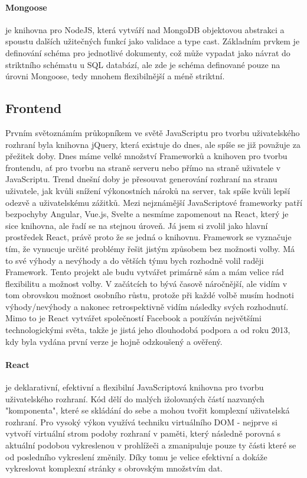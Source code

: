 \paragraph{Mongoose} je knihovna pro NodeJS, která vytváří nad MongoDB objektovou abstrakci a spoustu dalších užitečných funkcí jako validace a type cast. Základním prvkem je definování schéma pro jednotlivé dokumenty, což může vypadat jako návrat do striktního schématu u SQL databází, ale zde je schéma definované pouze na úrovni Mongoose, tedy mnohem flexibilnější a méně striktní.

\subsection{Frontend}
Prvním světoznámím průkopníkem ve světě JavaScriptu pro tvorbu uživatelského rozhraní byla knihovna jQuery, která existuje do dnes, ale spíše se již považuje za přežitek doby. Dnes máme velké množství Frameworků a knihoven pro tvorbu frontendu, ať pro tvorbu na straně serveru nebo přímo na straně uživatele v JavaScriptu. Trend dnešní doby je přesouvat generování rozhraní na stranu uživatele, jak kvůli snížení výkonostních nároků na server, tak spíše kvůli lepší odezvě a uživatelskému zážitků. Mezi nejznámější JavaScriptové frameworky patří bezpochyby Angular, Vue.js, Svelte a nesmíme zapomenout na React, který je sice knihovna, ale řadí se na stejnou úroveň. Já jsem si zvolil jako hlavní prostředek React, právě proto že se jedná o knihovnu. Framework se vyznačuje tím, že vynucuje určité problémy řešit jistým způsobem bez možnosti volby. Má to své výhody a nevýhody a do větších týmu bych rozhodně volil raději Framework. Tento projekt ale budu vytvářet primárně sám a mám velice rád flexibilitu a možnost volby. V začátcích to bývá časově náročnější, ale vidím v tom obrovskou možnost osobního růstu, protože při každé volbě musím hodnoti výhody/nevýhody a nakonec retrospektivně vidím následky svých rozhodnutí. Mimo to je React vytvářet společností Facebook a používán největšími technologickými světa, takže je jistá jeho dlouhodobá podpora a od roku 2013, kdy byla vydána první verze je hojně odzkoušený a ověřený.

\paragraph{React} je deklarativní, efektivní a flexibilní JavaScriptová knihovna pro tvorbu uživatelského rozhraní. Kód dělí do malých ižolovaných částí nazvaných "komponenta", které se skládání do sebe a mohou tvořit komplexní uživatelská rozhraní. Pro vysoký výkon využívá techniku virtuálního DOM - nejprve si vytvoří virtuální strom podoby rozhraní v paměti, který následně porovná s aktuální podobou vykreslenou v prohlížeči a zmanipuluje pouze ty části které se od posledního vykreslení změnily. Díky tomu je velice efektivní a dokáže vykreslovat komplexní stránky s obrovským množstvím dat.


